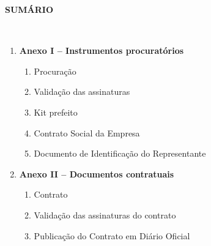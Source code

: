 \documentclass[
]{article}
\author{}
\date{}
\begin{document}
\textbf{SUMÁRIO}\\
\strut \\
\begin{enumerate}
  \item \textbf{Anexo I -- Instrumentos procuratórios }
  \begin{enumerate}
    \item Procuração 
    \item Validação das assinaturas 
    \item Kit prefeito 
    \item Contrato Social da Empresa 
    \item Documento de Identificação do Representante 
  \end{enumerate}

  \item \textbf{Anexo II -- Documentos contratuais }
  \begin{enumerate}
    \item Contrato 
    \item Validação das assinaturas do contrato 
    \item Publicação do Contrato em Diário Oficial 
  \end{enumerate}



\end{enumerate}
\end{document}
